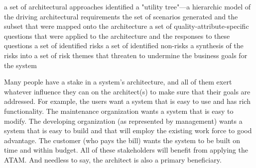 a set of architectural approaches identified
a "utility tree"—a hierarchic model of the driving architectural requirements
the set of scenarios generated and the subset that were mapped onto the architecture
a set of quality-attribute-specific questions that were applied to the architecture and the responses to these questions
a set of identified risks
a set of identified non-risks
a synthesis of the risks into a set of risk themes that threaten to undermine the business goals for the system

Many people have a stake in a system's architecture, and all of them exert whatever influence they can on the architect(s) to make sure that their goals are addressed. For example, the users want a system that is easy to use and has rich functionality. The maintenance organization wants a system that is easy to modify. The developing organization (as represented by management) wants a system that is easy to build and that will employ the existing work force to good advantage. The customer (who pays the bill) wants the system to be built on time and within budget. All of these stakeholders will benefit from applying the ATAM. And needless to say, the architect is also a primary beneficiary.

